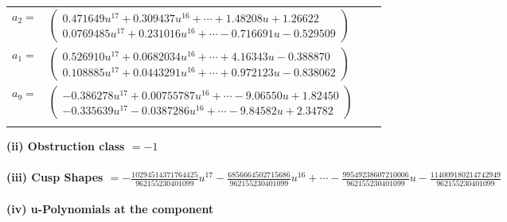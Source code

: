 \documentclass[1p]{elsarticle_modified}
\theoremstyle{definition}
\begin{document}
\begin{tabular}{m{7pt} m{180pt} m{7pt} m{180pt} }
\flushright $a_{2}=$&$\begin{pmatrix}0.471649 u^{17}+0.309437 u^{16}+\cdots+1.48208 u+1.26622\\0.0769485 u^{17}+0.231016 u^{16}+\cdots-0.716691 u-0.529509\end{pmatrix}$ \\
\flushright $a_{1}=$&$\begin{pmatrix}0.526910 u^{17}+0.0682034 u^{16}+\cdots+4.16343 u-0.388870\\0.108885 u^{17}+0.0443291 u^{16}+\cdots+0.972123 u-0.838062\end{pmatrix}$ \\
\flushright $a_{9}=$&$\begin{pmatrix}-0.386278 u^{17}+0.00755787 u^{16}+\cdots-9.06550 u+1.82450\\-0.335639 u^{17}-0.0387286 u^{16}+\cdots-9.84582 u+2.34782\end{pmatrix}$\\&\end{tabular}
\flushleft \textbf{(ii) Obstruction class $= -1$}\\~\\
\flushleft \textbf{(iii) Cusp Shapes $= -\frac{10294514371764425}{962155230401099} u^{17}-\frac{6856664502715686}{962155230401099} u^{16}+\cdots-\frac{99549238607210006}{962155230401099} u-\frac{114009180214742949}{962155230401099}$}\\~\\
\newpage\renewcommand{\arraystretch}{1}
\flushleft \textbf{(iv) u-Polynomials at the component}\newline \\
\end{document}
